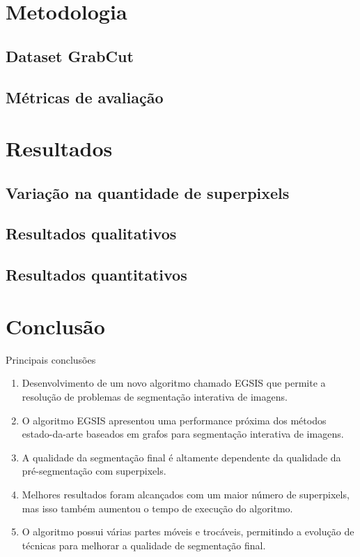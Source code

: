 \documentclass{templatebeamerufc/libs/ufc_format}
\begin{document}
\section{Metodologia}

\subsection{Dataset GrabCut}

\subsection{Métricas de avaliação}


\section{Resultados}

\subsection{Variação na quantidade de superpixels}
\subsection{Resultados qualitativos}
\subsection{Resultados quantitativos}

\section{Conclusão}
\begin{frame}{Principais conclusões}
  \begin{enumerate}[<+->]

  \item Desenvolvimento de um novo algoritmo chamado EGSIS que permite
    a resolução de problemas de segmentação interativa de imagens.

  \item O algoritmo EGSIS apresentou uma performance próxima dos métodos
    estado-da-arte baseados em grafos para segmentação interativa de
    imagens.

  \item A qualidade da segmentação final é altamente dependente da
    qualidade da pré-segmentação com superpixels.

  \item Melhores resultados foram alcançados com um maior número de
    superpixels, mas isso também aumentou o tempo de execução do
    algoritmo.

  \item O algoritmo possui várias partes móveis e trocáveis, permitindo a
    evolução de técnicas para melhorar a qualidade de segmentação final.

  \end{enumerate}
\end{frame}
\end{document}
